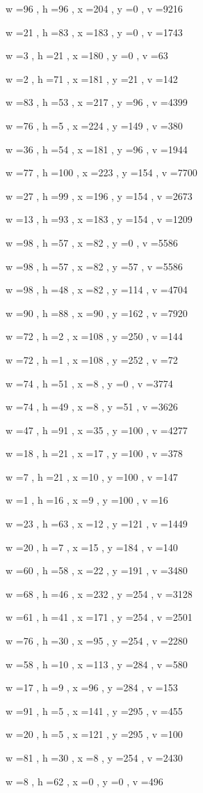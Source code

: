\documentclass[11pt]{article}
\begin{document}
w =96 , h =96 , x =204 , y =0 , v =9216
\par
w =21 , h =83 , x =183 , y =0 , v =1743
\par
w =3 , h =21 , x =180 , y =0 , v =63
\par
w =2 , h =71 , x =181 , y =21 , v =142
\par
w =83 , h =53 , x =217 , y =96 , v =4399
\par
w =76 , h =5 , x =224 , y =149 , v =380
\par
w =36 , h =54 , x =181 , y =96 , v =1944
\par
w =77 , h =100 , x =223 , y =154 , v =7700
\par
w =27 , h =99 , x =196 , y =154 , v =2673
\par
w =13 , h =93 , x =183 , y =154 , v =1209
\par
w =98 , h =57 , x =82 , y =0 , v =5586
\par
w =98 , h =57 , x =82 , y =57 , v =5586
\par
w =98 , h =48 , x =82 , y =114 , v =4704
\par
w =90 , h =88 , x =90 , y =162 , v =7920
\par
w =72 , h =2 , x =108 , y =250 , v =144
\par
w =72 , h =1 , x =108 , y =252 , v =72
\par
w =74 , h =51 , x =8 , y =0 , v =3774
\par
w =74 , h =49 , x =8 , y =51 , v =3626
\par
w =47 , h =91 , x =35 , y =100 , v =4277
\par
w =18 , h =21 , x =17 , y =100 , v =378
\par
w =7 , h =21 , x =10 , y =100 , v =147
\par
w =1 , h =16 , x =9 , y =100 , v =16
\par
w =23 , h =63 , x =12 , y =121 , v =1449
\par
w =20 , h =7 , x =15 , y =184 , v =140
\par
w =60 , h =58 , x =22 , y =191 , v =3480
\par
w =68 , h =46 , x =232 , y =254 , v =3128
\par
w =61 , h =41 , x =171 , y =254 , v =2501
\par
w =76 , h =30 , x =95 , y =254 , v =2280
\par
w =58 , h =10 , x =113 , y =284 , v =580
\par
w =17 , h =9 , x =96 , y =284 , v =153
\par
w =91 , h =5 , x =141 , y =295 , v =455
\par
w =20 , h =5 , x =121 , y =295 , v =100
\par
w =81 , h =30 , x =8 , y =254 , v =2430
\par
w =8 , h =62 , x =0 , y =0 , v =496
\par
\newpage
\end{document}
